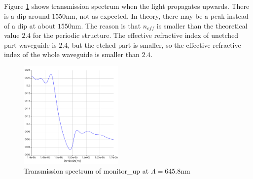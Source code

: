 \documentclass[fontsize=11pt]{scrartcl}
\begin{document}
\subsection{}
Figure \ref{fig3.2} shows transmission spectrum when the light propagates upwards. 
There is a dip around $1550\mathrm{nm}$, not as expected. 
In theory, there may be a peak instead of a dip at about $1550\mathrm{nm}$. 
The reason is that $n_{eff}$ is smaller than the theoretical value $2.4$ 
for the periodic structure. 
The effective refractive index of unetched part waveguide is $2.4$, 
but the etched part is smaller, 
so the effective refractive index of the whole waveguide is smaller than $2.4$.
\begin{figure}[H]
    \centering
     \includegraphics[width=0.45\textwidth]{img/fig3.2.png}
     \caption{Transmission spectrum of monitor\_up at $\Lambda=645.8\mathrm{nm}$}
     \label{fig3.2}
\end{figure}
\end{document}
